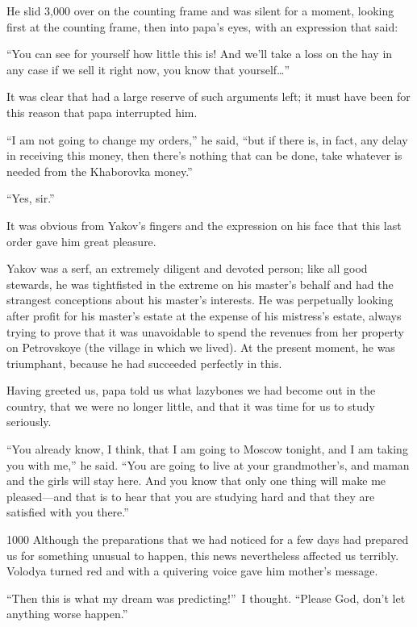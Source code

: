 He slid 3,000 over on the counting frame and was silent for a moment, looking first at the counting frame, then into papa's eyes, with an expression that said:

``You can see for yourself how little this is! And we'll take a loss on the hay in any case if we sell it right now, you know that yourself\ldots{}'' %

It was clear that had a large reserve of such arguments left; it must have been for this reason that papa interrupted him.

``I am not going to change my orders,'' he said, ``but if there is, in fact, any delay in receiving this money, then there's nothing that can be done, take whatever is needed from the Khaborovka money.'' %

``Yes, sir.'' %

It was obvious from Yakov's fingers and the expression on his face that this last order gave him great pleasure.

Yakov was a serf, an extremely diligent and devoted person; like all good stewards, he was tightfisted in the extreme on his master's behalf and had the strangest conceptions about his master's interests. He was perpetually looking after profit for his master's estate at the expense of his mistress's estate, always trying to prove that it was unavoidable to spend the revenues from her property on Petrovskoye (the village in which we lived). At the present moment, he was triumphant, because he had succeeded perfectly in this.

Having greeted us, papa told us what lazybones we had become out in the country, that we were no longer little, and that it was time for us to study seriously.

``You already know, I think, that I am going to Moscow tonight, and I am taking you with me,'' he said. ``You are going to live at your grandmother's, and maman and the girls will stay here. And you know that only one thing will make me pleased---and that is to hear that you are studying hard and that they are satisfied with you there.'' %

\begin{tolerant}{1000}
Although the preparations that we had noticed for a few days had prepared us for something unusual to happen, this news nevertheless affected us terribly. Volodya turned red and with a quivering voice gave him mother's message.
\end{tolerant}

``Then this is what my dream was predicting!''~I thought. ``Please God, don't let anything worse happen.'' %

